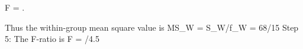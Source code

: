 F = .




















Thus the within-group mean square value is
MS_W = S_W/f_W = 68/15 
Step 5: The F-ratio is
F =  /4.5 
